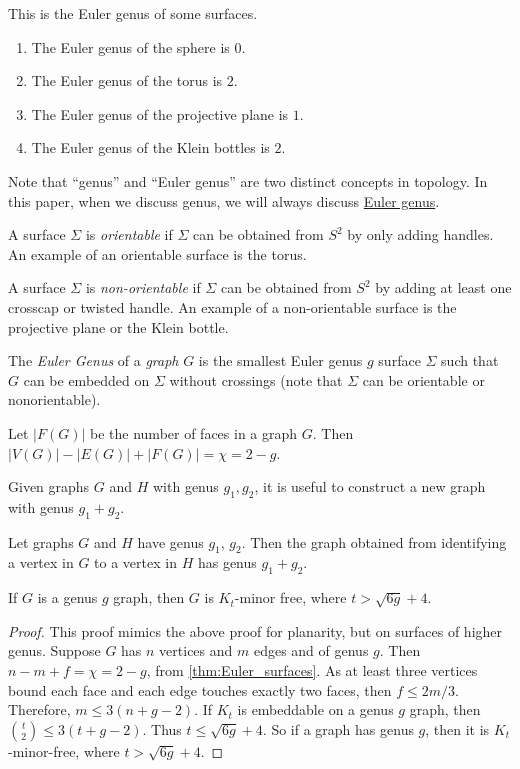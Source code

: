 \begin{example}
	This is the Euler genus of some surfaces.
	\begin{enumerate}
		\item The Euler genus of the sphere is \(0\).
		\item The Euler genus of the torus is \(2\).
		\item The Euler genus of the projective plane is \(1\). 
		\item The Euler genus of the Klein bottles is \(2\). 
	\end{enumerate}
\end{example}

Note that ``genus'' and ``Euler genus'' are two distinct concepts in topology. In this paper, when we discuss genus, we will always discuss \underline{Euler genus}.

A surface \(\Sigma\) is \textit{orientable} if \(\Sigma\) can be obtained from \(S^2\) by only adding handles. An example of an orientable surface is the torus.

A surface \(\Sigma\) is \textit{non-orientable} if \(\Sigma\) can be obtained from \(S^2\) by adding at least one crosscap or twisted handle. An example of a non-orientable surface is the projective plane or the Klein bottle. 

The \textit{Euler Genus} of a \textit{graph} \(G\) is the smallest Euler genus \(g\) surface \(\Sigma\) such that \(G\) can be embedded on \(\Sigma\) without crossings (note that \(\Sigma\) can be orientable or nonorientable). 

\begin{theorem}\label{thm:Euler_surfaces}
	Let \(|F(G)|\) be the number of faces in a graph \(G\). Then \(|V(G)| - |E(G)| + |F(G)| = \chi = 2 - g\). 
\end{theorem}

Given graphs $G$ and $H$ with genus $g_1, g_2$, it is useful to construct a new graph with genus $g_1 + g_2$. 
\begin{theorem}\label{thm:additivity_genus}
	Let graphs $G$ and $H$ have genus $g_1$, $g_2$. Then the graph obtained from identifying a vertex in $G$ to a vertex in $H$ has genus $g_1 + g_2$. 
\end{theorem}

\begin{theorem}\label{thm:bounded_genus_kt_free}
	If \(G\) is a genus \(g\) graph, then \(G\) is \(K_t\)-minor free, where \(t > \sqrt{6g} + 4\). 
\end{theorem}
\begin{proof}
	This proof mimics the above proof for planarity, but on surfaces of higher genus. 
	Suppose \(G\) has \(n\) vertices and \(m\) edges and of genus $g$. Then \(n - m + f = \chi = 2-g\), from \cref{thm:Euler_surfaces}. As at least three vertices bound each face and each edge touches exactly two faces, then \(f \leq 2m/3\). Therefore, \(m \leq 3(n + g - 2)\). If \(K_t\) is embeddable on a genus \(g\) graph, then \(\binom{t}{2} \leq 3 (t + g - 2)\). Thus \(t \leq \sqrt{6g} + 4\). So if a graph has genus \(g\), then it is \(K_t\)-minor-free, where \(t > \sqrt{6g} + 4\). 
\end{proof}

